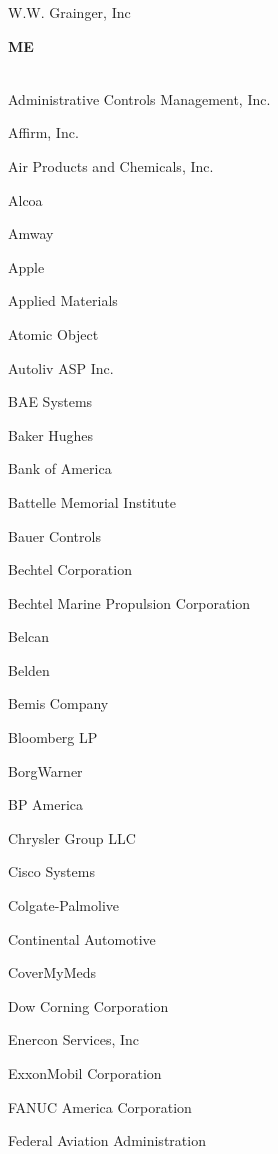 \documentclass[twoside]{article}
\begin{document}
\begin{center}
\begin{multicols}{5}
\begin{FlushLeft}
\begin{compactitem}
\item W.W. Grainger, Inc
\end{compactitem}
        \end{FlushLeft}
        \vspace{1em}
        {\fontsize{14}{16}\selectfont \bf ME}\\
        \vspace{-1em}
        ~\hrulefill~
        \vspace{-.9em}
        \begin{FlushLeft}
        \begin{compactitem}
        \item Administrative Controls Management, Inc.
\item Affirm, Inc.
\item Air Products and Chemicals, Inc.
\item Alcoa
\item Amway
\item Apple
\item Applied Materials
\item Atomic Object
\item Autoliv ASP Inc.
\item BAE Systems
\item Baker Hughes
\item Bank of America
\item Battelle Memorial Institute
\item Bauer Controls
\item Bechtel Corporation
\item Bechtel Marine Propulsion Corporation
\item Belcan
\item Belden
\item Bemis Company
\item Bloomberg LP
\item BorgWarner
\item BP America
\item Chrysler Group LLC
\item Cisco Systems
\item Colgate-Palmolive
\item Continental Automotive
\item CoverMyMeds
\item Dow Corning Corporation
\item Enercon Services, Inc
\item ExxonMobil Corporation
\item FANUC America Corporation
\item Federal Aviation Administration

\end{compactitem}
\end{FlushLeft}
\end{multicols}
\end{center}
\end{document}
